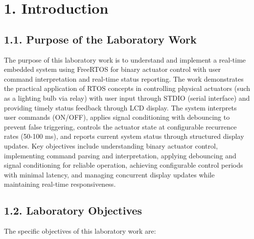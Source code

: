 \documentclass[12pt]{article}
\begin{document}
\setcounter{page}{1}
\pagestyle{fancy}
\fancyhf{}
\rhead{\thepage}

\section*{1. Introduction}

\subsection*{1.1. Purpose of the Laboratory Work}

The purpose of this laboratory work is to understand and implement a real-time embedded system using FreeRTOS for binary actuator control with user command interpretation and real-time status reporting. The work demonstrates the practical application of RTOS concepts in controlling physical actuators (such as a lighting bulb via relay) with user input through STDIO (serial interface) and providing timely status feedback through LCD display. The system interprets user commands (ON/OFF), applies signal conditioning with debouncing to prevent false triggering, controls the actuator state at configurable recurrence rates (50-100 ms), and reports current system status through structured display updates. Key objectives include understanding binary actuator control, implementing command parsing and interpretation, applying debouncing and signal conditioning for reliable operation, achieving configurable control periods with minimal latency, and managing concurrent display updates while maintaining real-time responsiveness.

\subsection*{1.2. Laboratory Objectives}

The specific objectives of this laboratory work are:
\end{document}
